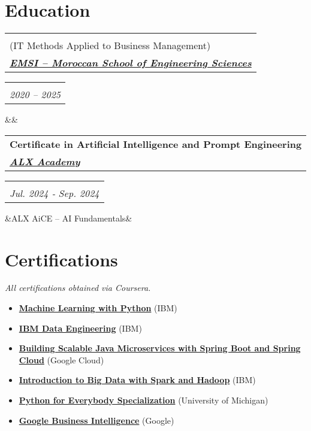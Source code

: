 \documentclass[10pt,a4paper,sans]{moderncv}
\makeatletter
\newcommand*{\customcventry}[7][.10em]{%
\begin{tabular}{@{}l}
    {\bfseries #4} \\
    {\itshape #3}
\end{tabular}
\hfill
\begin{tabular}{l@{}}
    {\bfseries #5} \\
    {\itshape #2}
\end{tabular}
\ifx&#7&%
\else{\\
\begin{minipage}{\maincolumnwidth}%
    \footnotesize#7%
\end{minipage}}\fi%
\par\addvspace{#1}
}
\makeatother
\begin{document}
\vspace{-18pt}
\section{\fontsize{11.2}{13}\selectfont Education}
\vspace{-4pt}
\customcventry{2020 -- 2025}{\href{https://emsi.ma}{\textbf{EMSI – Moroccan School of Engineering Sciences}}}{Master’s degree in Software Engineering and Networks \\ (IT Methods Applied to Business Management)}{}{}{}
\customcventry{Jul. 2024 ‐ Sep. 2024}{\href{https://www.alxafrica.com}{\textbf{ALX Academy}}}{Certificate in Artificial Intelligence and Prompt Engineering}{}{}{ALX AiCE – AI Fundamentals}


\vspace{-18pt}
\section{\fontsize{11.2}{13}\selectfont Certifications}
\vspace{-5pt}
    \textit{All certifications obtained via Coursera.}
\begin{itemize}[leftmargin=0.3cm, itemsep=-2pt, topsep=0pt, partopsep=0pt, parsep=0pt]
    \item \textbf{\href{https://www.coursera.org/account/accomplishments/verify/G178XXP17WQA}{Machine Learning with Python}} (IBM)
    \item \textbf{\href{https://www.coursera.org/account/accomplishments/records/M5RKGX36BAVA}{IBM Data Engineering}} (IBM)
    \item \textbf{\href{https://google.com}{Building Scalable Java Microservices with Spring Boot and Spring Cloud}} (Google Cloud)
    \item \textbf{\href{https://www.coursera.org/account/accomplishments/verify/EK5SJM3YM7PX}{Introduction to Big Data with Spark and Hadoop}} (IBM)
    \item \textbf{\href{https://www.coursera.org/account/accomplishments/specialization/B4RCUAYCUG49}{Python for Everybody Specialization}} (University of Michigan)
    \item \textbf{\href{https://www.coursera.org/account/accomplishments/records/G867SJLRFQS2}{Google Business Intelligence}} (Google)
\end{itemize}


\vspace{-17pt}
\end{document}
